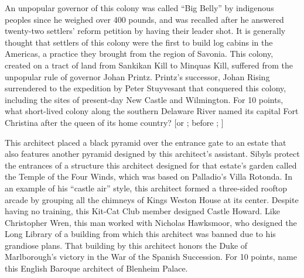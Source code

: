 \documentclass[10pt]{article}
\begin{document}
\begin{tossup}
An unpopular governor of this colony was called “Big Belly” by indigenous peoples since he weighed over 400
pounds, and was recalled after he answered twenty-two settlers’ reform petition by having their leader shot. It is
generally thought that settlers of this colony were the first to build log cabins in the Americas, a practice they
brought from the region of Savonia. This colony, created on a tract of land from Sankikan Kill to Minquas Kill,
suffered from the unpopular rule of governor Johan Printz. Printz’s successor, Johan Rising 
surrendered to the expedition by Peter Stuyvesant  that conquered this colony, including the sites
of present-day New Castle and Wilmington. For 10 points, what short-lived colony along the southern Delaware
River named its capital Fort Christina after the queen of its home country?
[or  ;
 before ;
]
\end{tossup}


\begin{tossup}
This architect placed a black pyramid over the entrance gate to an estate that also features another pyramid
designed by this architect’s assistant. Sibyls protect the entrances of a structure this architect designed for that
estate’s garden called the Temple of the Four Winds, which was based on Palladio’s Villa Rotonda. In an example
of his “castle air” style, this architect formed a three-sided rooftop arcade by grouping all the chimneys of Kings
Weston House at its center. Despite having no training, this Kit-Cat Club member designed Castle Howard. Like
Christopher Wren, this man worked with Nicholas Hawksmoor, who designed the Long Library of a building from
which this architect was banned due to his grandiose plans. That building by this architect honors the Duke of
Marlborough’s victory in the War of the Spanish Succession. For 10 points, name this English Baroque architect of
Blenheim Palace.
\end{tossup}
\end{document}
